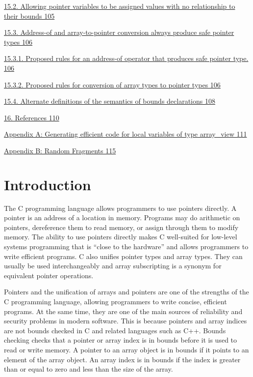 \documentclass[]{article}
\begin{document}
\protect\hyperlink{ux5fToc440551963}{15.2. Allowing pointer variables to
be assigned values with no relationship to their bounds 105}

\protect\hyperlink{ux5fToc440551964}{15.3. Address-of and
array-to-pointer conversion always produce safe pointer types 106}

\protect\hyperlink{ux5fToc440551965}{15.3.1. Proposed rules for an
address-of operator that produces safe pointer type. 106}

\protect\hyperlink{ux5fToc440551966}{15.3.2. Proposed rules for
conversion of array types to pointer types 106}

\protect\hyperlink{ux5fToc440551967}{15.4. Alternate definitions of the
semantics of bounds declarations 108}

\protect\hyperlink{ux5fToc440551968}{16. References 110}

\protect\hyperlink{ux5fToc440551969}{Appendix A: Generating efficient
code for local variables of type array\_view 111}

\protect\hyperlink{ux5fToc440551970}{Appendix B: Random Fragments 115}

\section{\texorpdfstring{\protect\hypertarget{ux5fToc420589164}{}{\protect\hypertarget{ux5fToc422906945}{}{\protect\hypertarget{ux5fToc424307668}{}{\protect\hypertarget{ux5fToc426641052}{}{\protect\hypertarget{ux5fToc435434912}{}{\protect\hypertarget{ux5fToc437460733}{}{\protect\hypertarget{ux5fToc440445407}{}{\protect\hypertarget{ux5fToc440449189}{}{\protect\hypertarget{ux5fToc440551839}{}{}}}}}}}}}Introduction}{Introduction}}\label{introduction}

The C programming language allows programmers to use pointers directly.
A pointer is an address of a location in memory. Programs may do
arithmetic on pointers, dereference them to read memory, or assign
through them to modify memory. The ability to use pointers directly
makes C well-suited for low-level systems programming that is ``close to
the hardware'' and allows programmers to write efficient programs. C
also unifies pointer types and array types. They can usually be used
interchangeably and array subscripting is a synonym for equivalent
pointer operations.

Pointers and the unification of arrays and pointers are one of the
strengths of the C programming language, allowing programmers to write
concise, efficient programs. At the same time, they are one of the main
sources of reliability and security problems in modern software. This is
because pointers and array indices are not bounds checked in C and
related languages such as C++. Bounds checking checks that a pointer or
array index is in bounds before it is used to read or write memory. A
pointer to an array object is in bounds if it points to an element of
the array object. An array index is in bounds if the index is greater
than or equal to zero and less than the size of the array.
\end{document}
